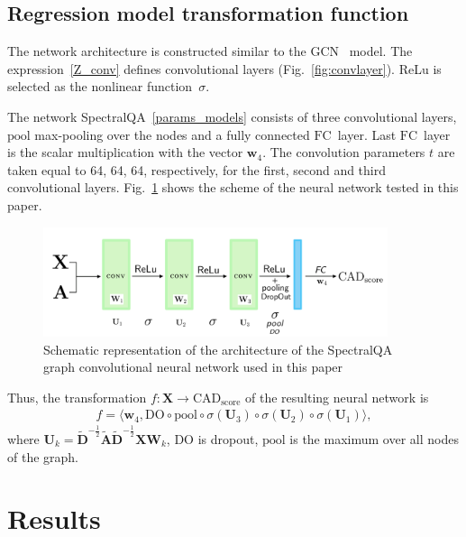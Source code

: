 \documentclass[12pt,twosides]{extarticle}
\begin{document}
\subsection{Regression model transformation function}
The network architecture is constructed similar to the GCN~\cite{kipf_semi-supervised_2017} model. The expression~\eqref{Z_conv} defines convolutional layers (Fig.~\ref{fig:convlayer}). ReLu is selected as the nonlinear function~$\sigma$.

The network SpectralQA~\eqref{params_models} consists of three convolutional layers, $\text{pool}$ max-pooling over the nodes and a fully connected $\text{FC}$~layer. Last $\text{FC}$~layer is the scalar multiplication with the vector $\mathbf{w}_4$. The convolution parameters $t$ are taken equal to 64, 64, 64, respectively, for the first, second and third convolutional layers. Fig.~\ref{fig:scheme} shows the scheme of the neural network tested in this paper.
\begin{figure}[H]
	\centering
	\includegraphics[width=0.9\textwidth]{net.pdf}
	\caption{Schematic representation of the architecture of the SpectralQA graph convolutional neural network used in this paper}
	\label{fig:scheme}
\end{figure}
Thus, the transformation $f: \mathbf{X} \rightarrow \text{CAD}_\text{score}$ of the resulting neural network is
\begin{align}
f = \langle \mathbf{w}_4, \text{DO} \circ \text{pool} \circ \sigma \left(\mathbf{U}_3\right) \circ\sigma\left( \mathbf{U}_2\right)\circ\sigma\left( \mathbf{U}_1\right)\rangle,
\label{regression_function}
\end{align}
where $\mathbf{U}_k= \tilde{\mathbf{D}}^{-\frac{1}{2}} \tilde{\mathbf{A}}\tilde{\mathbf{D}}^{-\frac{1}{2}} \mathbf{X} \mathbf{W}_k$, $\text{DO}$ is dropout, $\text{pool}$ is the maximum over all nodes of the graph.

\section{Results}
\label{section:data_section}
\end{document}
